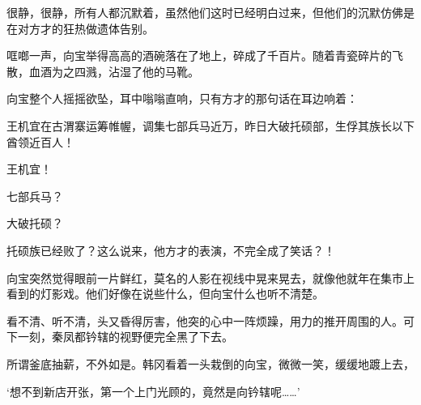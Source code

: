 很静，很静，所有人都沉默着，虽然他们这时已经明白过来，但他们的沉默仿佛是在对方才的狂热做遗体告别。

哐啷一声，向宝举得高高的酒碗落在了地上，碎成了千百片。随着青瓷碎片的飞散，血酒为之四溅，沾湿了他的马靴。

向宝整个人摇摇欲坠，耳中嗡嗡直响，只有方才的那句话在耳边响着：

王机宜在古渭寨运筹帷幄，调集七部兵马近万，昨日大破托硕部，生俘其族长以下酋领近百人！

王机宜！

七部兵马？

大破托硕？

托硕族已经败了？这么说来，他方才的表演，不完全成了笑话？！

向宝突然觉得眼前一片鲜红，莫名的人影在视线中晃来晃去，就像他就年在集市上看到的灯影戏。他们好像在说些什么，但向宝什么也听不清楚。

看不清、听不清，头又昏得厉害，他突的心中一阵烦躁，用力的推开周围的人。可下一刻，秦凤都钤辖的视野便完全黑了下去。

所谓釜底抽薪，不外如是。韩冈看着一头栽倒的向宝，微微一笑，缓缓地踱上去，

‘想不到新店开张，第一个上门光顾的，竟然是向钤辖呢……’

